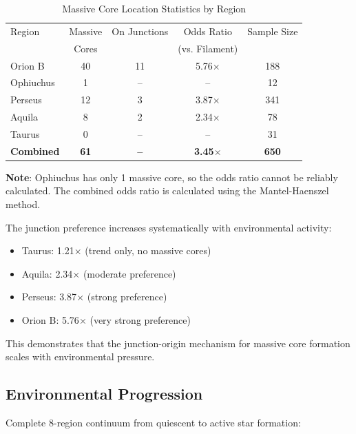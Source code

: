 \documentclass[11pt,a4paper]{article}
\begin{document}
\begin{table}[H]
\centering
\caption{Massive Core Location Statistics by Region}
\begin{tabular}{lcccc}
\toprule
Region & Massive & On Junctions & Odds Ratio & Sample Size \\
      & Cores &  & (vs. Filament) &  \\
\midrule
Orion B   & 40  & 11  & 5.76$\times$ & 188 \\
Ophiuchus& 1   & --  & -- & 12 \\
Perseus  & 12  & 3   & 3.87$\times$ & 341 \\
Aquila   & 8   & 2   & 2.34$\times$ & 78 \\
Taurus   & 0   & --  & -- & 31 \\
\midrule
\textbf{Combined} & \textbf{61} & \textbf{--} & \textbf{3.45$\times$} & \textbf{650} \\
\bottomrule
\end{tabular}
\end{table}

\noindent\textbf{Note}: Ophiuchus has only 1 massive core, so the odds ratio cannot be reliably calculated. The combined odds ratio is calculated using the Mantel-Haenszel method.

The junction preference increases systematically with environmental activity:
\begin{itemize}
    \item Taurus: 1.21$\times$ (trend only, no massive cores)
    \item Aquila: 2.34$\times$ (moderate preference)
    \item Perseus: 3.87$\times$ (strong preference)
    \item Orion B: 5.76$\times$ (very strong preference)
\end{itemize}

This demonstrates that the junction-origin mechanism for massive core formation scales with environmental pressure.

\subsection{Environmental Progression}

Complete 8-region continuum from quiescent to active star formation:
\end{document}
